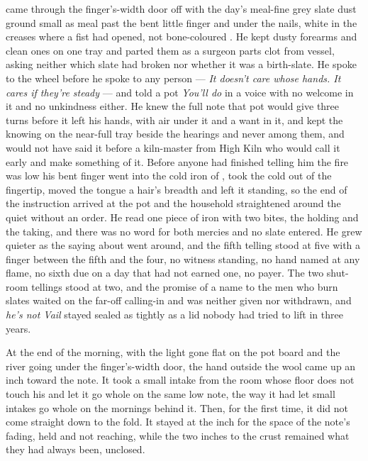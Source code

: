  came through the finger's-width door off  with the day's meal-fine grey slate dust ground small as meal past the bent little finger and under the nails, white in the creases where a fist had opened, not bone-coloured . He kept dusty forearms and clean ones on one tray and parted them as a surgeon parts clot from vessel, asking neither which slate had broken nor whether it was a birth-slate. He spoke to the wheel before he spoke to any person --- \emph{It doesn't care whose hands. It cares if they're steady} --- and told a pot \emph{You'll do} in a voice with no welcome in it and no unkindness either. He knew the full note that pot would give three turns before it left his hands, with air under it and a want in it, and kept the knowing on the near-full tray beside the hearings and never among them, and would not have said it before a kiln-master from High Kiln who would call it early and make something of it. Before anyone had finished telling him the fire was low his bent finger went into the cold iron of , took the cold out of the fingertip, moved the tongue a hair's breadth and left it standing, so the end of the instruction arrived at the pot and the household straightened around the quiet without an order. He read one piece of iron with two bites, the holding and the taking, and there was no  word for both mercies and no slate entered. He grew quieter as the saying about  went around, and the fifth telling stood at five with a finger between the fifth and the four, no witness standing, no hand named at any flame, no sixth due on a day that had not earned one, no payer. The two shut-room tellings stood at two, and the promise of a name to the men who burn slates waited on the far-off calling-in and was neither given nor withdrawn, and \emph{he's not Vail} stayed sealed as tightly as a lid nobody had tried to lift in three years.

\scenebreak

At the end of the morning, with the light gone flat on the pot board and the river going under the finger's-width door, the hand outside the wool came up an inch toward the note. It took a small intake from the room whose floor does not touch his and let it go whole on the same low note, the way it had let small intakes go whole on the mornings behind it. Then, for the first time, it did not come straight down to the fold. It stayed at the inch for the space of the note's fading, held and not reaching, while the two inches to the crust remained what they had always been, unclosed.


